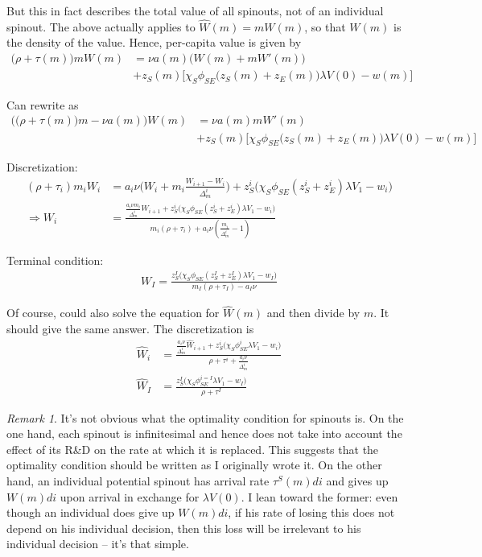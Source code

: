 \documentclass[12pt,english]{article}
\theoremstyle{remark}
\newtheorem*{remark}{Remark}
\begin{document}
But this in fact describes the total value of all spinouts, not of an individual spinout. The above actually applies to $\hat{W}(m) = mW(m)$, so that $W(m)$ is the density of the value. Hence, per-capita value is given by 
\begin{align*}
		\big(\rho + \tau(m)\big)mW(m) &= \nu a(m) \big(W(m) + mW'(m)\big)  \\
	&+ z_S(m) \Big[ \chi_S \phi_{SE}\big(z_S(m) + z_E(m)\big) \lambda V(0) - w(m) \Big] 
\end{align*}

Can rewrite as
\begin{align*}
		\Big(\big(\rho + \tau(m)  \big)m -  \nu a(m) \Big)W(m) &= \nu a(m) mW'(m)\\
	&+ z_S(m) \Big[ \chi_S \phi_{SE}\big(z_S(m) + z_E(m)\big) \lambda V(0) - w(m) \Big] 
\end{align*}

Discretization:
\begin{align*}
	(\rho + \tau_i)m_i W_i &= a_i \nu \big(W_i + m_i \frac{W_{i+1} - W_i}{\Delta_m^i}\big) + z_S^i \big( \chi_S \phi_{SE}(z_S^i + z_E^i) \lambda V_1 - w_i \big) \\
	\Rightarrow W_i &= \frac{\frac{a_i \nu m_i}{\Delta_m^i}W_{i+1} + z_S^i \big( \chi_S \phi_{SE}(z_S^i + z_E^i)\lambda V_1 - w_i \big)}{m_i(\rho+ \tau_i) + a_i \nu (\frac{m_i}{\Delta_m^i} - 1)} 
\end{align*}

Terminal condition:
\begin{align*}
	W_I = \frac{z_S^I \big (\chi_S \phi_{SE} (z_S^I + z_E^I) \lambda V_1 - w_I \big)}{m_I(\rho + \tau_I) - a_I \nu }
\end{align*}

Of course, could also solve the equation for $\hat{W}(m)$ and then divide by $m$. It should give the same answer. The discretization is 
\begin{align*}
	\hat{W}_i &= \frac{\frac{a_i \nu}{\Delta_m^i} \hat{W}_{i+1} + z_S^i \big( \chi_S \phi_{SE}^i \lambda V_1 - w_i \big)}{\rho + \tau^i + \frac{a_i \nu}{\Delta_m^i}} \\
	\hat{W}_I &= \frac{z_S^I \big(\chi_S \phi_{SE}^{i=I} \lambda V_1 - w_I \big)}{\rho + \tau^I}
\end{align*}

\begin{remark}
	It's not obvious what the optimality condition for spinouts is. On the one hand, each spinout is infinitesimal and hence does not take into account the effect of its R\&D on the rate at which it is replaced. This suggests that the optimality condition should be written as I originally wrote it. On the other hand, an individual potential spinout has arrival rate $\tau^S (m) di$ and gives up $W(m) di$ upon arrival in exchange for $\lambda V(0)$. I lean toward the former: even though an individual does give up $W(m)di$, if his rate of losing this does not depend on his individual decision, then this loss will be irrelevant to his individual decision -- it's that simple.
\end{remark}
\end{document}

